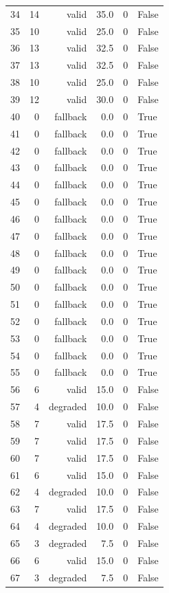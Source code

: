 \begin{small}
\begin{longtable}{@{}rrrrrl@{}}
34 & 14 & valid & 35.0 & 0 & False \\
35 & 10 & valid & 25.0 & 0 & False \\
36 & 13 & valid & 32.5 & 0 & False \\
37 & 13 & valid & 32.5 & 0 & False \\
38 & 10 & valid & 25.0 & 0 & False \\
39 & 12 & valid & 30.0 & 0 & False \\
40 & 0 & fallback & 0.0 & 0 & True \\
41 & 0 & fallback & 0.0 & 0 & True \\
42 & 0 & fallback & 0.0 & 0 & True \\
43 & 0 & fallback & 0.0 & 0 & True \\
44 & 0 & fallback & 0.0 & 0 & True \\
45 & 0 & fallback & 0.0 & 0 & True \\
46 & 0 & fallback & 0.0 & 0 & True \\
47 & 0 & fallback & 0.0 & 0 & True \\
48 & 0 & fallback & 0.0 & 0 & True \\
49 & 0 & fallback & 0.0 & 0 & True \\
50 & 0 & fallback & 0.0 & 0 & True \\
51 & 0 & fallback & 0.0 & 0 & True \\
52 & 0 & fallback & 0.0 & 0 & True \\
53 & 0 & fallback & 0.0 & 0 & True \\
54 & 0 & fallback & 0.0 & 0 & True \\
55 & 0 & fallback & 0.0 & 0 & True \\
56 & 6 & valid & 15.0 & 0 & False \\
57 & 4 & degraded & 10.0 & 0 & False \\
58 & 7 & valid & 17.5 & 0 & False \\
59 & 7 & valid & 17.5 & 0 & False \\
60 & 7 & valid & 17.5 & 0 & False \\
61 & 6 & valid & 15.0 & 0 & False \\
62 & 4 & degraded & 10.0 & 0 & False \\
63 & 7 & valid & 17.5 & 0 & False \\
64 & 4 & degraded & 10.0 & 0 & False \\
65 & 3 & degraded & 7.5 & 0 & False \\
66 & 6 & valid & 15.0 & 0 & False \\
67 & 3 & degraded & 7.5 & 0 & False \\

\end{longtable}
\end{small}
